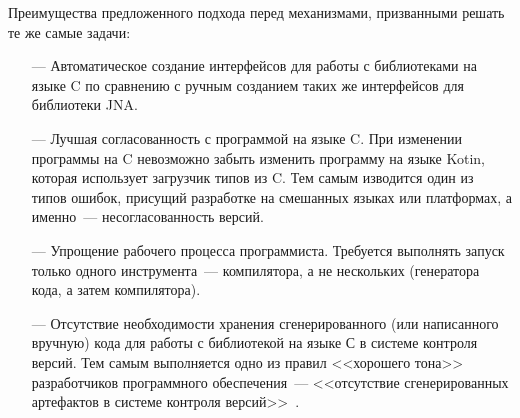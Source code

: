 Преимущества предложенного подхода перед механизмами, призванными решать те же самые задачи:
\begin{itemize}
\item[---] Автоматическое создание интерфейсов для работы с библиотеками на языке C по сравнению с ручным созданием таких же интерфейсов для библиотеки JNA.
\item[---] Лучшая согласованность с программой на языке C.
  При изменении программы на C невозможно забыть изменить программу на языке Kotin, которая использует загрузчик типов из C.
  Тем самым изводится один из типов ошибок, присущий разработке на смешанных языках или платформах, а именно~--- несогласованность версий.
\item[---] Упрощение рабочего процесса программиста. Требуется выполнять запуск только одного инструмента~--- компилятора, а не нескольких (генератора кода, а затем компилятора).
\item[---] Отсутствие необходимости хранения сгенерированного (или написанного вручную) кода для работы с библиотекой на языке С в системе контроля версий. Тем самым выполняется одно из правил <<хорошего тона>> разработчиков программного обеспечения~--- <<отсутствие сгенерированных артефактов в системе контроля версий>>~\cite{art-of-agile}.
\end{itemize}
